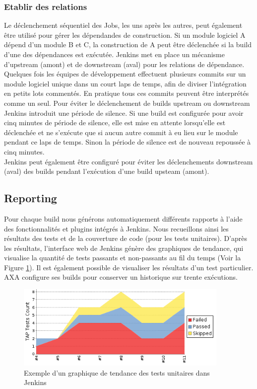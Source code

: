       \subsubsection{Etablir des relations}
      Le déclenchement séquentiel des Jobs, les uns après les autres, peut également être utilisé pour gérer les dépendandes de construction. Si un module logiciel A dépend d'un module B et C, la construction de A peut être déclenchée si la build d'une des dépendances est exécutée. Jenkins met en place un mécanisme d'upstream (amont) et de downstream (aval) pour les relations de dépendance. Quelques fois les équipes de développement effectuent plusieurs commits sur un module logiciel unique dans un court laps de temps, afin de diviser l'intégration en petits lots commentés. En pratique tous ces commits peuvent être interprétés comme un seul. Pour éviter le déclenchement de builds upstream ou downstream Jenkins introduit une période de silence. Si une build est configurée pour avoir cinq minutes de période de silence, elle est mise en attente lorsqu'elle est déclenchée et ne s'exécute que si aucun autre commit à eu lieu sur le module pendant ce laps de temps. Sinon la période de silence est de nouveau repoussée à cinq minutes.\\

      Jenkins peut également être configuré pour éviter les déclenchements downstream (aval) des builds pendant l'exécution d'une build upsteam (amont).

    \subsection{Reporting}
    Pour chaque build nous générons automatiquement différents rapports à l'aide des fonctionnalités et plugins intégrés à Jenkins. Nous recueillons ainsi les résultats des tests et de la couverture de code (pour les tests unitaires). D'après les résultats, l'interface web de Jenkins génère des graphiques de tendance, qui visualise la quantité de tests passants et non-passants au fil du temps (Voir la Figure \ref{JenkinsTestReport}). Il est également possible de visualiser les résultats d'un test particulier. AXA configure ses builds pour conserver un historique sur trente exécutions.\\

    \begin{figure}
      \begin{center}
        \includegraphics[scale=1]{images/JenkinsTestReport.png}
      \end{center}
      \caption{Exemple d'un graphique de tendance des tests unitaires dans Jenkins}
      \label{JenkinsTestReport}
    \end{figure}

